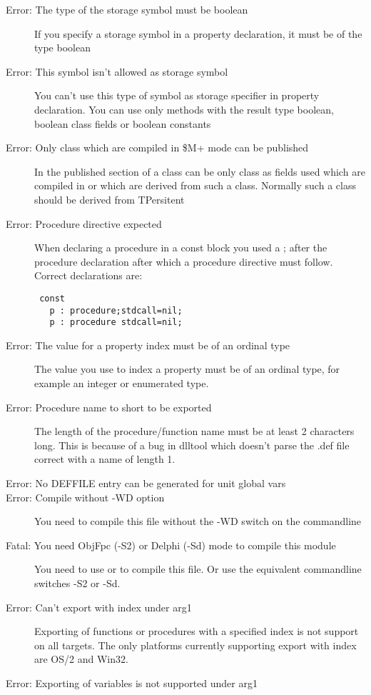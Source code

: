 \begin{description}
\item [Error: The type of the storage symbol must be boolean]
 If you specify a storage symbol in a property declaration, it must be of
 the type boolean
\item [Error: This symbol isn't allowed as storage symbol]
 You can't use this type of symbol as storage specifier in property
 declaration. You can use only methods with the result type boolean,
 boolean class fields or boolean constants
\item [Error: Only class which are compiled in \$M+ mode can be published]
 In the published section of a class can be only class as fields used which
 are compiled in  or which are derived from such a class. Normally
 such a class should be derived from TPersitent
\item [Error: Procedure directive expected]
 When declaring a procedure in a const block you used a ; after the
 procedure declaration after which a procedure directive must follow.
 Correct declarations are:
 \begin{verbatim}
 const
   p : procedure;stdcall=nil;
   p : procedure stdcall=nil;
 \end{verbatim}
\item [Error: The value for a property index must be of an ordinal type]
 The value you use to index a property must be of an ordinal type, for
 example an integer or enumerated type.
\item [Error: Procedure name to short to be exported]
 The length of the procedure/function name must be at least 2 characters
 long. This is because of a bug in dlltool which doesn't parse the .def
 file correct with a name of length 1.
\item [Error: No DEFFILE entry can be generated for unit global vars]
\item [Error: Compile without -WD option]
 You need to compile this file without the -WD switch on the
 commandline
\item [Fatal: You need ObjFpc (-S2) or Delphi (-Sd) mode to compile this module]
 You need to use  or  to compile this file.
 Or use the equivalent commandline switches -S2 or -Sd.
\item [Error: Can't export with index under arg1]
 Exporting of functions or procedures with a specified index is not
 support on all targets. The only platforms currently supporting
 export with index are OS/2 and Win32.
\item [Error: Exporting of variables is not supported under arg1]

\end{description}
